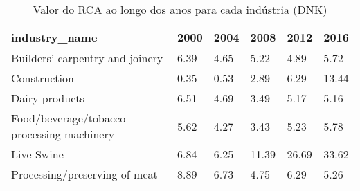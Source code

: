 \begin{table}
\centering
\caption{Valor do RCA ao longo dos anos para cada indústria (DNK)}
\begin{tabular}{p{6cm}p{1.5cm}p{1.5cm}p{1.5cm}p{1.5cm}p{1.5cm}}
\toprule
                             industry\_name & 2000 & 2004 &  2008 &  2012 &  2016 \\
\midrule
           Builders' carpentry and joinery & 6.39 & 4.65 &  5.22 &  4.89 &  5.72 \\
                              Construction & 0.35 & 0.53 &  2.89 &  6.29 & 13.44 \\
                            Dairy products & 6.51 & 4.69 &  3.49 &  5.17 &  5.16 \\
Food/beverage/tobacco processing machinery & 5.62 & 4.27 &  3.43 &  5.23 &  5.78 \\
                                Live Swine & 6.84 & 6.25 & 11.39 & 26.69 & 33.62 \\
             Processing/preserving of meat & 8.89 & 6.73 &  4.75 &  6.29 &  5.26 \\
\bottomrule
\end{tabular}
\end{table}
